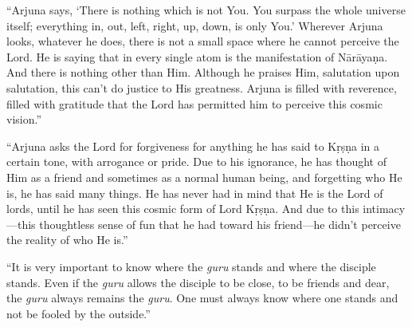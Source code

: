 \enquote{Arjuna says, \enquote{There is nothing which is not You. You surpass the whole universe itself; everything in, out, left, right, up, down, is only You.} Wherever Arjuna looks, whatever he does, there is not a small space where he cannot perceive the Lord. He is saying that in every single atom is the manifestation of Nārāyaṇa. And there is nothing other than Him. Although he praises Him, salutation upon salutation, this can’t do justice to His greatness. Arjuna is filled with reverence, filled with gratitude that the Lord has permitted him to perceive this cosmic vision.}

\enquote{Arjuna asks the Lord for forgiveness for anything he has said to Kṛṣṇa in a certain tone, with arrogance or pride. Due to his ignorance, he has thought of Him as a friend and sometimes as a normal human being, and forgetting who He is, he has said many things. He has never had in mind that He is the Lord of lords, until he has seen this cosmic form of Lord Kṛṣṇa. And due to this intimacy---this thoughtless sense of fun that he had toward his friend---he didn’t perceive the reality of who He is.}

\enquote{It is very important to know where the \textit{guru} stands and where the disciple stands. Even if the \textit{guru} allows the disciple to be close, to be friends and dear, the \textit{guru} always remains the \textit{guru}. One must always know where one stands and not be fooled by the outside.}

